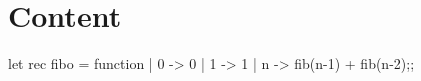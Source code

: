 \section{Content}
\begin{fs}
let rec fibo = function
| 0 -> 0
| 1 -> 1
| n -> fib(n-1) + fib(n-2);;
\end{fs}
